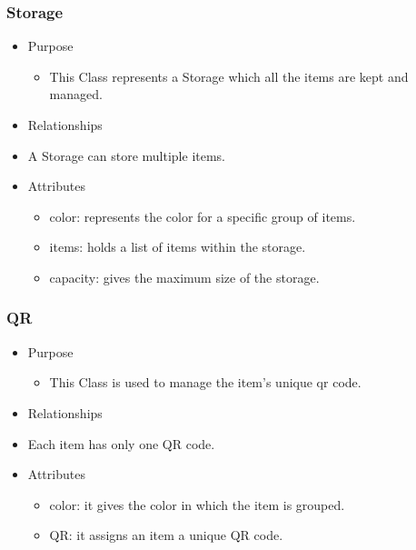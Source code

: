 \documentclass[hidelinks, 12pt, a4paper]{article}
\begin{document}
\begin{itemize}
    \subsubsection{Storage}
    \begin{itemize}
        \item Purpose
        \begin{itemize}
            \item This Class represents a Storage which all the items are kept and managed.
        \end{itemize}
        \item  Relationships
        \item A Storage can store multiple items.
        \item Attributes
        \begin{itemize}
            \item color: represents the color for a specific group of items.
            \item items: holds a list of items within the storage.
            \item capacity: gives the maximum size of the storage.
        \end{itemize}
    \end{itemize}



    \subsubsection{QR}
    \begin{itemize}
        \item Purpose
        \begin{itemize}
            \item This Class is used to manage the item's unique qr code.
        \end{itemize}
        \item  Relationships
        \item Each item has only one QR code.
        \item Attributes
        \begin{itemize}
            \item color: it gives the color in which the item is grouped.
            \item QR: it assigns an item a unique QR code.
        \end{itemize}
    \end{itemize}


\end{itemize}
\end{document}
